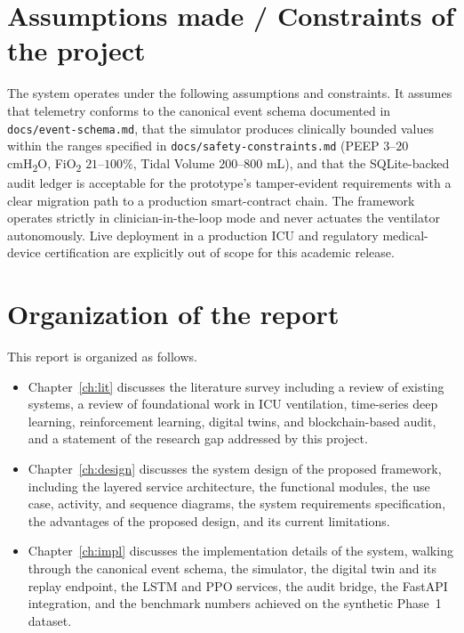 \documentclass[12pt,a4paper,oneside]{report}
\begin{document}
\section{Assumptions made / Constraints of the project}
The system operates under the following assumptions and constraints. It assumes that telemetry conforms to the canonical event schema documented in \texttt{docs/event-schema.md}, that the simulator produces clinically bounded values within the ranges specified in \texttt{docs/safety-constraints.md} (PEEP $3$--$20$ cmH\textsubscript{2}O, FiO\textsubscript{2} $21$--$100\%$, Tidal Volume $200$--$800$ mL), and that the SQLite-backed audit ledger is acceptable for the prototype's tamper-evident requirements with a clear migration path to a production smart-contract chain. The framework operates strictly in clinician-in-the-loop mode and never actuates the ventilator autonomously. Live deployment in a production ICU and regulatory medical-device certification are explicitly out of scope for this academic release.

\section{Organization of the report}
This report is organized as follows.
\begin{itemize}[leftmargin=*]
  \item Chapter~\ref{ch:lit} discusses the literature survey including a review of existing systems, a review of foundational work in ICU ventilation, time-series deep learning, reinforcement learning, digital twins, and blockchain-based audit, and a statement of the research gap addressed by this project.
  \item Chapter~\ref{ch:design} discusses the system design of the proposed framework, including the layered service architecture, the functional modules, the use case, activity, and sequence diagrams, the system requirements specification, the advantages of the proposed design, and its current limitations.
  \item Chapter~\ref{ch:impl} discusses the implementation details of the system, walking through the canonical event schema, the simulator, the digital twin and its replay endpoint, the LSTM and PPO services, the audit bridge, the FastAPI integration, and the benchmark numbers achieved on the synthetic Phase~1 dataset.
\end{itemize}

\end{document}
